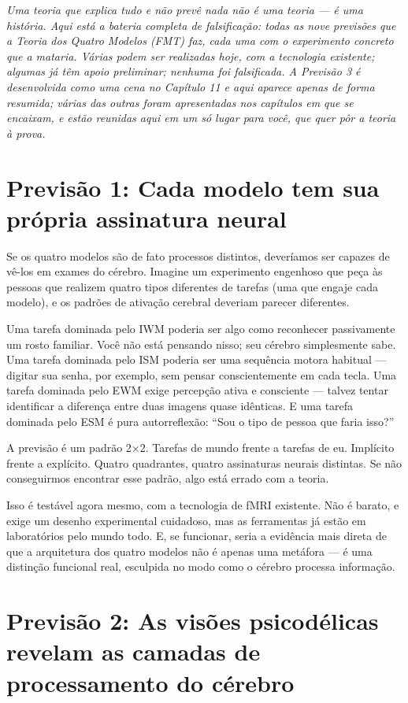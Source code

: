 \documentclass[11pt, twoside, openright]{book}
\begin{document}
\textit{Uma teoria que explica tudo e não prevê nada não é uma teoria --- é uma história. Aqui está a bateria completa de falsificação: todas as nove previsões que a Teoria dos Quatro Modelos (FMT) faz, cada uma com o experimento concreto que a mataria. Várias podem ser realizadas hoje, com a tecnologia existente; algumas já têm apoio preliminar; nenhuma foi falsificada. A Previsão 3 é desenvolvida como uma cena no Capítulo 11 e aqui aparece apenas de forma resumida; várias das outras foram apresentadas nos capítulos em que se encaixam, e estão reunidas aqui em um só lugar para você, que quer pôr a teoria à prova.}

\section*{Previsão 1: Cada modelo tem sua própria assinatura neural}

Se os quatro modelos são de fato processos distintos, deveríamos ser capazes de vê-los em exames do cérebro. Imagine um experimento engenhoso que peça às pessoas que realizem quatro tipos diferentes de tarefas (uma que engaje cada modelo), e os padrões de ativação cerebral deveriam parecer diferentes.

Uma tarefa dominada pelo IWM poderia ser algo como reconhecer passivamente um rosto familiar. Você não está pensando nisso; seu cérebro simplesmente sabe. Uma tarefa dominada pelo ISM poderia ser uma sequência motora habitual --- digitar sua senha, por exemplo, sem pensar conscientemente em cada tecla. Uma tarefa dominada pelo EWM exige percepção ativa e consciente --- talvez tentar identificar a diferença entre duas imagens quase idênticas. E uma tarefa dominada pelo ESM é pura autorreflexão: ``Sou o tipo de pessoa que faria isso?''

A previsão é um padrão 2×2. Tarefas de mundo frente a tarefas de eu. Implícito frente a explícito. Quatro quadrantes, quatro assinaturas neurais distintas. Se não conseguirmos encontrar esse padrão, algo está errado com a teoria.

Isso é testável agora mesmo, com a tecnologia de fMRI existente. Não é barato, e exige um desenho experimental cuidadoso, mas as ferramentas já estão em laboratórios pelo mundo todo. E, se funcionar, seria a evidência mais direta de que a arquitetura dos quatro modelos não é apenas uma metáfora --- é uma distinção funcional real, esculpida no modo como o cérebro processa informação.

\section*{Previsão 2: As visões psicodélicas revelam as camadas de processamento do cérebro}
\end{document}
